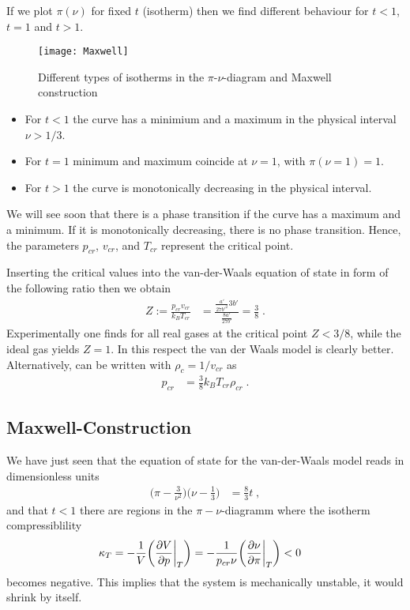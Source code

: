 If we plot $\pi(\nu)$ for fixed $t$ (isotherm) then we find different behaviour for $t<1$, $t=1$ and $t>1$.
%
\begin{figure}[htbp]
\begin{center}
\texttt{[image: Maxwell]}
\caption{Different types of isotherms in the $\pi$-$\nu$-diagram and Maxwell construction}
\label{fig:Maxwell:isotherms}
\end{center}
\end{figure}
%
\begin{itemize}
\item For $t<1$ the curve has a minimium and a maximum in the physical interval $\nu>1/3$.
\item For $t=1$ minimum and maximum coincide at $\nu=1$, with $\pi(\nu=1)=1$.
 \item For $t>1$ the curve is monotonically decreasing in the physical interval.
\end{itemize}
We will see soon that there is a phase transition if the curve has a maximum and a minimum.
 If it is monotonically decreasing, there is no phase transition. Hence, the parameters
 $p_{cr}$,  $v_{cr}$, and  $T_{cr}$ represent the  critical point.
 
 
Inserting the critical values into the van-der-Waals equation of state in form of the following ratio
then we obtain
%
\begin{align}\label{def:Z:cr}
Z:=\frac{p_{cr} v_{cr}}{k_{B} T_{cr}} &=  \frac{\frac{a'}{27 b'^{2}}3 b'}{\frac{8 a'}{27 b'}} =
\frac{3}{8}\;.
\end{align}
%
Experimentally one finds for all real gases at the critical point $Z<3/8$, while the ideal gas yields $Z=1$. In this respect the van der Waals model is clearly better.
Alternatively,  can be written with $\rho_{c}=1/v_{cr}$ as
%
\begin{align}\label{eq:p:cr}
p_{cr} &=\frac{3}{8} k_{B} T_{cr} \rho_{cr}\;.
\end{align}
%

\subsection{Maxwell-Construction}

We have just seen that the equation of state for the van-der-Waals model reads in dimensionless units
%
\begin{align*}
\bigg( \pi - \frac{3}{\nu^{2}} \bigg)\bigg(\nu  -\frac{1}{3}\bigg) &=\frac{8}{3} t\;,
\end{align*}
%
and that  $t<1$ there   are regions in the $\pi-\nu$-diagramm where the isotherm compressiblility
%
\begin{align}\label{eq:}
\kappa_{T}&= - \frac{1}{V} \bigg(  \frac{\partial V}{\partial p}\bigg|_{T}\bigg)
= - \frac{1}{p_{cr} \nu} \bigg(  \frac{\partial \nu}{\partial \pi}\bigg|_{T}\bigg) <0
\end{align}
%
becomes negative. This implies that the system is mechanically unstable, it would shrink by itself.

